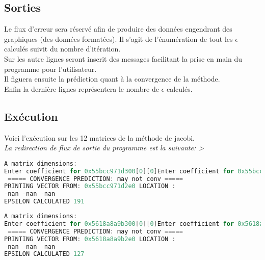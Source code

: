 \documentclass{report}
\begin{document}
\subsection{Sorties}
Le flux d'erreur sera réservé afin de produire des données engendrant des graphiques (des données formatées). Il s'agit de l'énumération de tout les $\epsilon$ calculés suivit du nombre d'itération. \\
Sur les autre lignes seront inscrit des messages facilitant la prise en main du programme pour l'utilisateur. \\
Il figuera ensuite la prédiction quant à la convergence de la méthode.\\
Enfin la dernière lignes représentera le nombre de $\epsilon$ calculés. \\
\subsection{Exécution}
Voici l'exécution sur les 12 matrices de la méthode de jacobi.\\
\textit{La redirection de flux de sortie du programme est la suivante: >}
\begin{lstlisting}[language=C,inputencoding=utf8, basicstyle=\fontsize{8}{10}\selectfont,caption=Execution with A1 matrix]
A matrix dimensions: 
Enter coefficient for 0x55bcc971d300[0][0]Enter coefficient for 0x55bcc971d300[0][1]Enter coefficient for 0x55bcc971d300[0][2]Enter coefficient for 0x55bcc971d300[1][0]Enter coefficient for 0x55bcc971d300[1][1]Enter coefficient for 0x55bcc971d300[1][2]Enter coefficient for 0x55bcc971d300[2][0]Enter coefficient for 0x55bcc971d300[2][1]Enter coefficient for 0x55bcc971d300[2][2]
 ===== CONVERGENCE PREDICTION: may not conv =====
PRINTING VECTOR FROM: 0x55bcc971d2e0 LOCATION :
-nan -nan -nan
EPSILON CALCULATED 191
\end{lstlisting}
\begin{lstlisting}[language=C,inputencoding=utf8, basicstyle=\fontsize{8}{10}\selectfont,caption=Execution with A2 matrix]
A matrix dimensions: 
Enter coefficient for 0x5618a8a9b300[0][0]Enter coefficient for 0x5618a8a9b300[0][1]Enter coefficient for 0x5618a8a9b300[0][2]Enter coefficient for 0x5618a8a9b300[1][0]Enter coefficient for 0x5618a8a9b300[1][1]Enter coefficient for 0x5618a8a9b300[1][2]Enter coefficient for 0x5618a8a9b300[2][0]Enter coefficient for 0x5618a8a9b300[2][1]Enter coefficient for 0x5618a8a9b300[2][2]
 ===== CONVERGENCE PREDICTION: may not conv =====
PRINTING VECTOR FROM: 0x5618a8a9b2e0 LOCATION :
-nan -nan -nan
EPSILON CALCULATED 127
\end{lstlisting}
\end{document}
